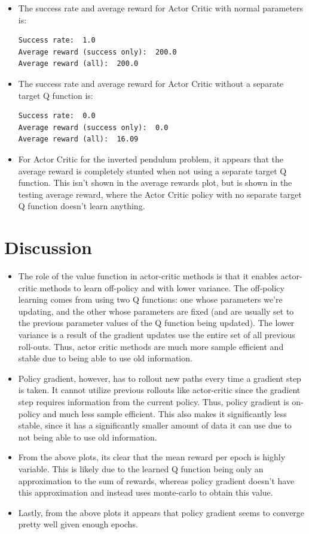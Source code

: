 \documentclass[12pt]{article}
\newcommand{\0}{\boldsymbol{0}}
\newcommand{\1}{\boldsymbol{1}}
\begin{document}
\begin{itemize}
    \item The success rate and average reward for Actor Critic with normal parameters is:
    \begin{verbatim}
Success rate:  1.0
Average reward (success only):  200.0
Average reward (all):  200.0
    \end{verbatim}

    \item The success rate and average reward for Actor Critic without a separate target Q function is:
    \begin{verbatim}
Success rate:  0.0
Average reward (success only):  0.0
Average reward (all):  16.09
    \end{verbatim}

    \item For Actor Critic for the inverted pendulum problem, it appears that the average reward is completely stunted when not using a separate target Q function. This isn't shown in the average rewards plot, but is shown in the testing average reward, where the Actor Critic policy with no separate target Q function doesn't learn anything.
    
\end{itemize}

\newpage

\section{Discussion}

\begin{itemize}
    \item The role of the value function in actor-critic methods is that it enables actor-critic methods to learn off-policy and with lower variance. The off-policy learning comes from using two Q functions: one whose parameters we're updating, and the other whose parameters are fixed (and are usually set to the previous parameter values of the Q function being updated). The lower variance is a result of the gradient updates use the entire set of all previous roll-outs. Thus, actor critic methods are much more sample efficient and stable due to being able to use old information.
    \item Policy gradient, however, has to rollout new paths every time a gradient step is taken. It cannot utilize previous rollouts like actor-critic since the gradient step requires information from the current policy. Thus, policy gradient is on-policy and much less sample efficient. This also makes it significantly less stable, since it has a significantly smaller amount of data it can use due to not being able to use old information.
    \item From the above plots, its clear that the mean reward per epoch is highly variable. This is likely due to the learned Q function being only an approximation to the sum of rewards, whereas policy gradient doesn't have this approximation and instead uses monte-carlo to obtain this value.
    \item Lastly, from the above plots it appears that policy gradient seems to converge pretty well given enough epochs.
\end{itemize}
\end{document}
